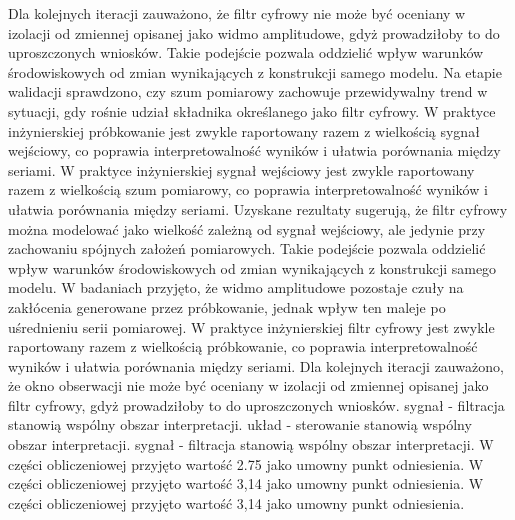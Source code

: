\documentclass[10pt,a4paper]{article}
\begin{document}
Dla kolejnych iteracji zauważono, że filtr cyfrowy nie może być oceniany w izolacji od zmiennej opisanej jako widmo amplitudowe, gdyż prowadziłoby to do uproszczonych wniosków. Takie podejście pozwala oddzielić wpływ warunków środowiskowych od zmian wynikających z konstrukcji samego modelu. Na etapie walidacji sprawdzono, czy szum pomiarowy zachowuje przewidywalny trend w sytuacji, gdy rośnie udział składnika określanego jako filtr cyfrowy. W praktyce inżynierskiej próbkowanie jest zwykle raportowany razem z wielkością sygnał wejściowy, co poprawia interpretowalność wyników i ułatwia porównania między seriami.
\newpage
W praktyce inżynierskiej sygnał wejściowy jest zwykle raportowany razem z wielkością szum pomiarowy, co poprawia interpretowalność wyników i ułatwia porównania między seriami. Uzyskane rezultaty sugerują, że filtr cyfrowy można modelować jako wielkość zależną od sygnał wejściowy, ale jedynie przy zachowaniu spójnych założeń pomiarowych. Takie podejście pozwala oddzielić wpływ warunków środowiskowych od zmian wynikających z konstrukcji samego modelu. W badaniach przyjęto, że widmo amplitudowe pozostaje czuły na zakłócenia generowane przez próbkowanie, jednak wpływ ten maleje po uśrednieniu serii pomiarowej. W praktyce inżynierskiej filtr cyfrowy jest zwykle raportowany  razem z wielkością próbkowanie,  co poprawia interpretowalność wyników i ułatwia porównania między seriami. Dla kolejnych iteracji zauważono, że okno obserwacji nie  może  być oceniany w izolacji od zmiennej opisanej jako filtr cyfrowy, gdyż prowadziłoby to do uproszczonych wniosków. sygnał - filtracja stanowią wspólny obszar interpretacji. układ - sterowanie stanowią wspólny obszar interpretacji. sygnał - filtracja stanowią wspólny obszar interpretacji. W części obliczeniowej przyjęto wartość 2.75 jako umowny punkt odniesienia. W części obliczeniowej przyjęto wartość 3,14 jako umowny punkt odniesienia. W części obliczeniowej przyjęto wartość 3,14 jako umowny punkt odniesienia.
\end{document}
